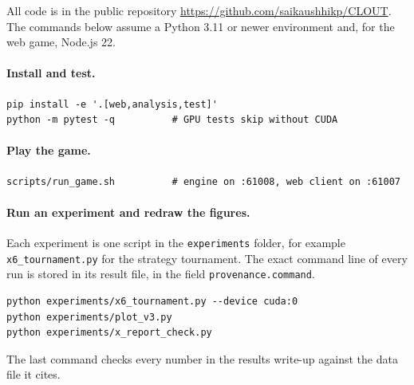 \documentclass[11pt,a4paper,oneside]{report}
\newcommand{\code}[1]{\texttt{#1}}
\newcommand{\repo}{\url{https://github.com/saikaushhikp/CLOUT}}
\begin{document}
All code is in the public repository \repo. The commands below assume a Python 3.11 or newer environment
and, for the web game, Node.js 22.

\paragraph{Install and test.}
\begin{verbatim}
pip install -e '.[web,analysis,test]'
python -m pytest -q          # GPU tests skip without CUDA
\end{verbatim}

\paragraph{Play the game.}
\begin{verbatim}
scripts/run_game.sh          # engine on :61008, web client on :61007
\end{verbatim}

\paragraph{Run an experiment and redraw the figures.}
Each experiment is one script in the \code{experiments} folder, for example \code{x6\_tournament.py} for
the strategy tournament. The exact command line of every run is stored in its result file, in the field
\code{provenance.command}.
\begin{verbatim}
python experiments/x6_tournament.py --device cuda:0
python experiments/plot_v3.py
python experiments/x_report_check.py
\end{verbatim}
The last command checks every number in the results write-up against the data file it cites.
\end{document}
